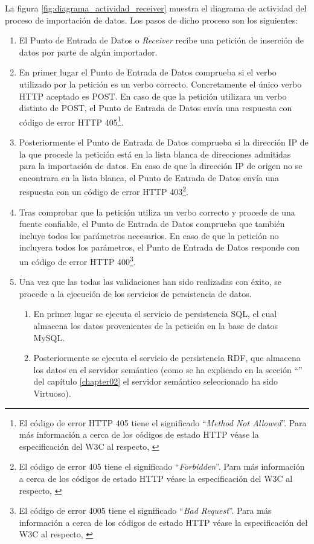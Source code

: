 La figura \ref{fig:diagrama_actividad_receiver} muestra el diagrama de actividad del proceso de importación de datos.  Los pasos de dicho proceso son los siguientes:
\begin{enumerate}
	\item El Punto de Entrada de Datos o \textit{Receiver} recibe una petición de inserción de datos por parte de algún importador.
	\item En primer lugar el Punto de Entrada de Datos comprueba si el verbo utilizado por la petición es un verbo correcto.  Concretamente el único verbo HTTP aceptado es POST.  En caso de que la petición utilizara un verbo distinto de POST, el Punto de Entrada de Datos envía una respuesta con código de error HTTP 405\footnote{El código de error HTTP 405 tiene el significado ``\textit{Method Not Allowed}''.  Para más información a cerca de los códigos de estado HTTP véase la especificación del W3C al respecto, \cite{w3c:http-status-codes}}.
	\item Posteriormente el Punto de Entrada de Datos comprueba si la dirección IP de la que procede la petición está en la lista blanca de direcciones admitidas para la importación de datos.  En caso de que la dirección IP de origen no se encontrara en la lista blanca, el Punto de Entrada de Datos envía una respuesta con un código de error HTTP 403\footnote{El código de error 405 tiene el significado ``\textit{Forbidden}''.  Para más información a cerca de los códigos de estado HTTP véase la especificación del W3C al respecto, \cite{w3c:http-status-codes}}.
	\item Tras comprobar que la petición utiliza un verbo correcto y procede de una fuente confiable, el Punto de Entrada de Datos comprueba que también incluye todos los parámetros necesarios.  En caso de que la petición no incluyera todos los parámetros, el Punto de Entrada de Datos responde con un código de error HTTP 400\footnote{El código de error 4005 tiene el significado ``\textit{Bad Request}''.  Para más información a cerca de los códigos de estado HTTP véase la especificación del W3C al respecto, \cite{w3c:http-status-codes}}.
	\item Una vez que las todas las validaciones han sido realizadas con éxito, se procede a la ejecución de los servicios de persistencia de datos.
		\begin{enumerate}
			\item En primer lugar se ejecuta el servicio de persistencia SQL, el cual almacena los datos provenientes de la petición en la base de datos MySQL.
			\item Posteriormente se ejecuta el servicio de persistencia RDF, que almacena los datos en el servidor semántico (como se ha explicado en la sección ``'' del capítulo \ref{chapter02} el servidor semántico seleccionado ha sido Virtuoso).

\end{enumerate}
\end{enumerate}
